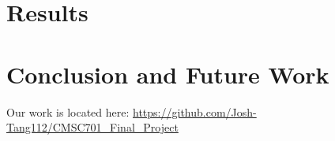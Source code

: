 \documentclass[unnumsec,webpdf,contemporary,large]{oup-authoring-template}
\begin{document}
\section{Results}

\section{Conclusion and Future Work}

Our work is located here:
\url{https://github.com/Josh-Tang112/CMSC701_Final_Project}



\end{document}
